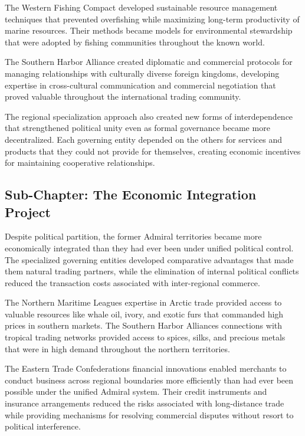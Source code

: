 The Western Fishing Compact developed sustainable resource management
techniques that prevented overfishing while maximizing long-term
productivity of marine resources. Their methods became models for
environmental stewardship that were adopted by fishing communities
throughout the known world.

The Southern Harbor Alliance created diplomatic and commercial protocols
for managing relationships with culturally diverse foreign kingdoms,
developing expertise in cross-cultural communication and commercial
negotiation that proved valuable throughout the international trading
community.

The regional specialization approach also created new forms of
interdependence that strengthened political unity even as formal
governance became more decentralized. Each governing entity depended on
the others for services and products that they could not provide for
themselves, creating economic incentives for maintaining cooperative
relationships.

\subsection{Sub-Chapter: The Economic Integration
Project}\label{sub-chapter-the-economic-integration-project}

Despite political partition, the former Admiral territories became more
economically integrated than they had ever been under unified political
control. The specialized governing entities developed comparative
advantages that made them natural trading partners, while the
elimination of internal political conflicts reduced the transaction
costs associated with inter-regional commerce.

The Northern Maritime League\textquotesingle s expertise in Arctic trade
provided access to valuable resources like whale oil, ivory, and exotic
furs that commanded high prices in southern markets. The Southern Harbor
Alliance\textquotesingle s connections with tropical trading networks
provided access to spices, silks, and precious metals that were in high
demand throughout the northern territories.

The Eastern Trade Confederation\textquotesingle s financial innovations
enabled merchants to conduct business across regional boundaries more
efficiently than had ever been possible under the unified Admiral
system. Their credit instruments and insurance arrangements reduced the
risks associated with long-distance trade while providing mechanisms for
resolving commercial disputes without resort to political interference.

